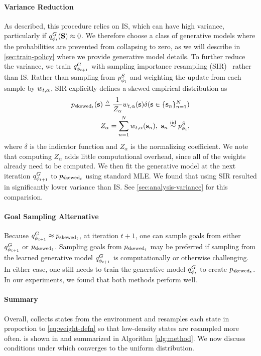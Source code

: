 \paragraph{Variance Reduction}
As described, this procedure relies on IS, which can have high variance, particularly if ${q^G_{{\phi}_t}}({\mathbf{S}}) \approx 0$.
We therefore choose a class of generative models where the probabilities are prevented from collapsing to zero, as we will describe in \autoref{sec:train-policy} where we provide generative model details.
To further reduce the variance, we train ${q^G_{{\phi}_{t+1}}}$ with sampling importance resampling (SIR)~\citep{rubin1988using} rather than IS.
Rather than sampling from ${p^S_{{\phi}_t}}$ and weighting the update from each sample by ${w_{t, \alpha}}$, SIR explicitly defines a skewed empirical distribution as
\begin{align}\label{eq:pskew-defn}
    {p_{\text{skewed}_t}}(\mathbf{s}) \triangleq \frac{1}{Z_\alpha} {w_{t, \alpha}}(\mathbf{s}) \delta(\mathbf{s} \in \{\mathbf{s}_n\}_{n=1}^{N})
    \\\nonumber
    Z_\alpha = \sum_{n=1}^N {w_{t, \alpha}}(\mathbf{s}_n),\ \mathbf{s}_n \overset{\text{iid}}{\sim} {p^S_{{\phi}_t}},
\end{align}
where $\delta$ is the indicator function and $Z_\alpha$ is the normalizing coefficient.
We note that computing $Z_\alpha$ adds little computational overhead, since all of the weights already need to be computed.
We then fit the generative model at the next iteration ${q^G_{{\phi}_{t+1}}}$ to ${p_{\text{skewed}_t}}$ using standard MLE.
We found that using SIR resulted in significantly lower variance than IS.
See \autoref{sec:analysis-variance} for this comparision.

\paragraph{Goal Sampling Alternative}
Because ${q^G_{{\phi}_{t+1}}} \approx {p_{\text{skewed}_t}}$, at iteration $t+1$, one can sample goals from either ${q^G_{{\phi}_{t+1}}}$ or ${p_{\text{skewed}_t}}$.
Sampling goals from ${p_{\text{skewed}_t}}$ may be preferred if sampling from the learned generative model ${q^G_{{\phi}_{t+1}}}$ is computationally or otherwise challenging.
In either case, one still needs to train the generative model ${q^G_{{\phi}_t}}$ to create ${p_{\text{skewed}_t}}$.
In our experiments, we found that both methods perform well.

\paragraph{Summary}
Overall, \METHOD collects states from the environment and resamples each state in proportion to \autoref{eq:weight-defn} so that low-density states are resampled more often.
\METHOD is shown in  and summarized in Algorithm \ref{alg:method}.
We now discuss conditions under which \METHOD converges to the uniform distribution.

